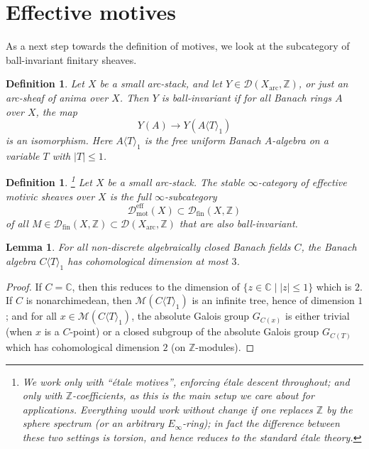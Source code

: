 \documentclass[11pt]{amsart}
\numberwithin{equation}{section}
\numberwithin{theorem}{section}
\newtheorem{lemma}[theorem]{Lemma}
\newtheorem{definition}[theorem]{Definition}
\theoremstyle{definition}
\begin{document}
\section{Effective motives}

As a next step towards the definition of motives, we look at the subcategory of ball-invariant finitary sheaves.

\begin{definition} Let $X$ be a small arc-stack, and let $Y\in \mathcal D(X_{\mathrm{arc}},\mathbb Z)$, or just an arc-sheaf of anima over $X$. Then $Y$ is ball-invariant if for all Banach rings $A$ over $X$, the map
\[
Y(A)\to Y(A\langle T\rangle_1)
\]
is an isomorphism. Here $A\langle T\rangle_1$ is the free uniform Banach $A$-algebra on a variable $T$ with $|T|\leq 1$.
\end{definition}

\begin{definition}\label{def:effmotives}\footnote{We work only with ``\'etale motives'', enforcing \'etale descent throughout; and only with $\mathbb Z$-coefficients, as this is the main setup we care about for applications. Everything would work without change if one replaces $\mathbb Z$ by the sphere spectrum (or an arbitrary $E_\infty$-ring); in fact the difference between these two settings is torsion, and hence reduces to the standard \'etale theory.} Let $X$ be a small arc-stack. The stable $\infty$-category of effective motivic sheaves over $X$ is the full $\infty$-subcategory
\[
\mathcal D_{\mathrm{mot}}^{\mathrm{eff}}(X)\subset \mathcal D_{\mathrm{fin}}(X,\mathbb Z)
\]
of all $M\in \mathcal D_{\mathrm{fin}}(X,\mathbb Z)\subset \mathcal D(X_{\mathrm{arc}},\mathbb Z)$ that are also ball-invariant.
\end{definition}

\begin{lemma} For all non-discrete algebraically closed Banach fields $C$, the Banach algebra $C\langle T\rangle_1$ has cohomological dimension at most $3$.
\end{lemma}

\begin{proof} If $C=\mathbb C$, then this reduces to the dimension of $\{z\in \mathbb C\mid |z|\leq 1\}$ which is $2$. If $C$ is nonarchimedean, then $\mathcal M(C\langle T\rangle_1)$ is an infinite tree, hence of dimension $1$; and for all $x\in \mathcal M(C\langle T\rangle_1)$, the absolute Galois group $G_{C(x)}$ is either trivial (when $x$ is a $C$-point) or a closed subgroup of the absolute Galois group $G_{C(T)}$ which has cohomological dimension $2$ (on $\mathbb Z$-modules).
\end{proof}
\end{document}
